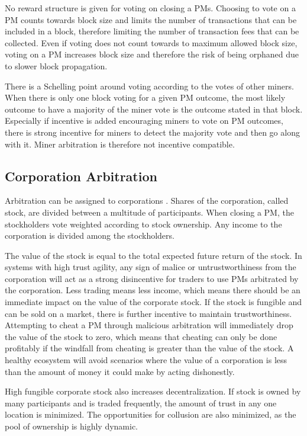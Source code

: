 \documentclass[onecolumn]{article}
\begin{document}
No reward structure is given for voting on closing a PMs.
Choosing to vote on a PM counts towards block size and limits the number of transactions that can be included in a block, therefore limiting the number of transaction fees that can be collected.
Even if voting does not count towards to maximum allowed block size, voting on a PM increases block size and therefore the risk of being orphaned due to slower block propagation.

There is a Schelling point \cite{focal} \cite{focal-wiki} around voting according to the votes of other miners.
When there is only one block voting for a given PM outcome, the most likely outcome to have a majority of the miner vote is the outcome stated in that block.
Especially if incentive is added encouraging miners to vote on PM outcomes, there is strong incentive for miners to detect the majority vote and then go along with it.
Miner arbitration is therefore not incentive compatible.

\subsection{Corporation Arbitration}
Arbitration can be assigned to corporations \cite{pmob}.
Shares of the corporation, called stock, are divided between a multitude of participants.
When closing a PM, the stockholders vote weighted according to stock ownership.
Any income to the corporation is divided among the stockholders.

The value of the stock is equal to the total expected future return of the stock.
In systems with high trust agility, any sign of malice or untrustworthiness from the corporation will act as a strong disincentive for traders to use PMs arbitrated by the corporation.
Less trading means less income, which means there should be an immediate impact on the value of the corporate stock.
If the stock is fungible and can be sold on a market, there is further incentive to maintain trustworthiness.
Attempting to cheat a PM through malicious arbitration will immediately drop the value of the stock to zero, which means that cheating can only be done profitably if the windfall from cheating is greater than the value of the stock.
A healthy ecosystem will avoid scenarios where the value of a corporation is less than the amount of money it could make by acting dishonestly.

High fungible corporate stock also increases decentralization.
If stock is owned by many participants and is traded frequently, the amount of trust in any one location is minimized.
The opportunities for collusion are also minimized, as the pool of ownership is highly dynamic.
\end{document}
